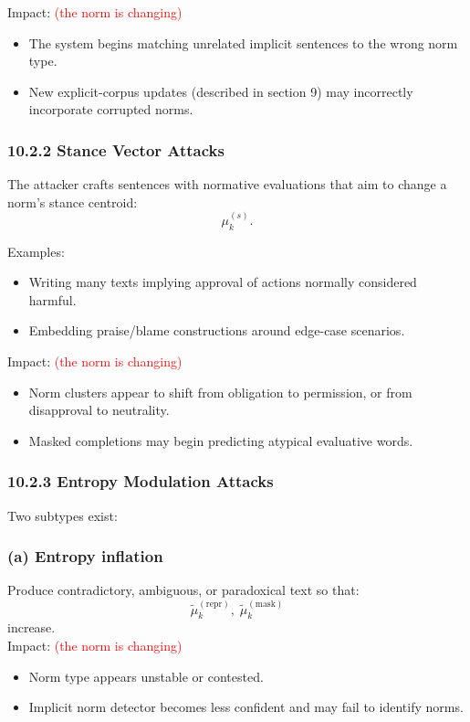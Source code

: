 \documentclass{article}
\begin{document}
Impact: \textcolor{red}{(the norm is changing)}
\begin{itemize}
    \item The system begins matching unrelated implicit sentences to the wrong norm type.
    \item New explicit-corpus updates (described in section 9) may incorrectly incorporate corrupted norms. \\
\end{itemize}

\subsubsection*{10.2.2  Stance Vector Attacks}
The attacker crafts sentences with normative evaluations that aim to change a norm’s stance centroid:
\[
\mu_k^{(s)}.
\]

Examples:
\begin{itemize}
    \item Writing many texts implying approval of actions normally considered harmful.
    \item Embedding praise/blame constructions around edge-case scenarios. \\
\end{itemize}

Impact: \textcolor{red}{(the norm is changing)}
\begin{itemize}
    \item Norm clusters appear to shift from obligation to permission, or from disapproval to neutrality.
    \item Masked completions may begin predicting atypical evaluative words.\\
\end{itemize}

\subsubsection*{10.2.3  Entropy Modulation Attacks} 

Two subtypes exist:

\subsubsection*{(a) Entropy inflation}
Produce contradictory, ambiguous, or paradoxical text so that:
\[
\tilde{\mu}_k^{(\text{repr})},\;\tilde{\mu}_k^{(\text{mask})}
\]
increase. \\

Impact: \textcolor{red}{(the norm is changing)}
\begin{itemize}
    \item Norm type appears unstable or contested.
    \item Implicit norm detector becomes less confident and may fail to identify norms.
\end{itemize}
\end{document}
